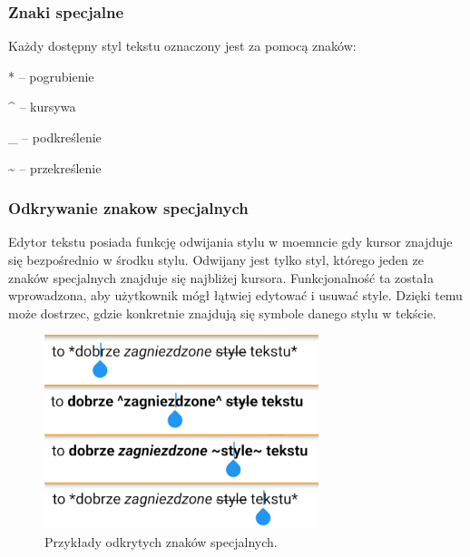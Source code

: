 \subsubsection{Znaki specjalne}

Każdy dostępny styl tekstu oznaczony jest za pomocą znaków:

\begin{compactitem}
    
    \item [*] \hspace{1mm} -- pogrubienie
    \item [\^{}] \hspace{1mm} -- kursywa
    \item [\_{}] \hspace{1mm} -- podkreślenie
    \item [\~{}] \hspace{1mm} -- przekreślenie
\end{compactitem}

\subsubsection{Odkrywanie znakow specjalnych}

Edytor tekstu posiada funkcję odwijania stylu w moemncie gdy kursor znajduje się bezpośrednio w środku stylu. Odwijany jest tylko styl, którego jeden ze znaków specjalnych znajduje się najbliżej kursora. Funkcjonalność ta została wprowadzona, aby użytkownik mógł łątwiej edytować i usuwać style.
Dzięki temu może dostrzec, gdzie konkretnie znajdują się symbole danego stylu w tekście.


\begin{figure}[ht]
    \centering
    \includegraphics[width=8cm]{images/pokazywanie_znakow_specjalnych.png}
    \caption{Przykłady odkrytych znaków specjalnych.}
    \vspace{3mm}
\end{figure}

